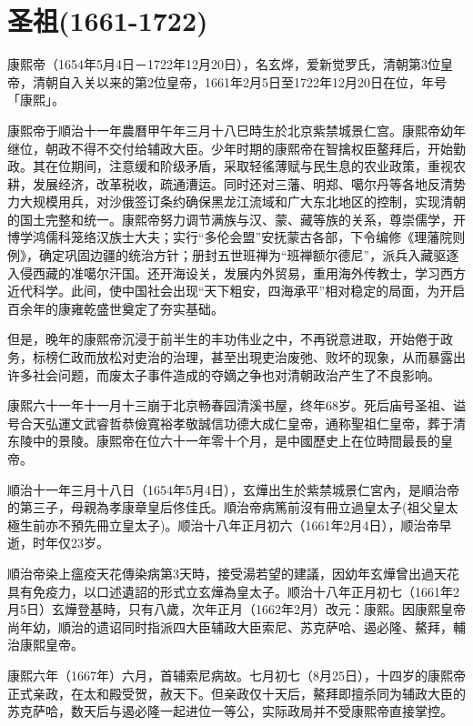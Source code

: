 
\section{圣祖\tiny(1661-1722)}

康熙帝（1654年5月4日－1722年12月20日），名玄烨，爱新觉罗氏，清朝第3位皇帝，清朝自入关以来的第2位皇帝，1661年2月5日至1722年12月20日在位，年号「康熙」。

康熙帝于順治十一年農曆甲午年三月十八巳時生於北京紫禁城景仁宫。康熙帝幼年继位，朝政不得不交付给辅政大臣。少年时期的康熙帝在智擒权臣鳌拜后，开始勤政。其在位期间，注意缓和阶级矛盾，采取轻徭薄赋与民生息的农业政策，重视农耕，发展经济，改革税收，疏通漕运。同时还对三藩、明郑、噶尔丹等各地反清势力大规模用兵，对沙俄签订条约确保黑龙江流域和广大东北地区的控制，实现清朝的国土完整和统一。康熙帝努力调节满族与汉、蒙、藏等族的关系，尊崇儒学，开博学鸿儒科笼络汉族士大夫；实行“多伦会盟”安抚蒙古各部，下令编修《理藩院则例》，确定巩固边疆的统治方针；册封五世班禅为“班禅额尔德尼”，派兵入藏驱逐入侵西藏的准噶尔汗国。还开海设关，发展内外贸易，重用海外传教士，学习西方近代科学。此间，使中国社会出现“天下粗安，四海承平”相对稳定的局面，为开启百余年的康雍乾盛世奠定了夯实基础。

但是，晚年的康熙帝沉浸于前半生的丰功伟业之中，不再锐意进取，开始倦于政务，标榜仁政而放松对吏治的治理，甚至出現吏治废弛、败坏的现象，从而暴露出许多社会问题，而废太子事件造成的夺嫡之争也对清朝政治产生了不良影响。

康熙六十一年十一月十三崩于北京畅春园清溪书屋，终年68岁。死后庙号圣祖、谥号合天弘運文武睿哲恭儉寬裕孝敬誠信功德大成仁皇帝，通称聖祖仁皇帝，葬于清东陵中的景陵。康熙帝在位六十一年零十个月，是中國歷史上在位時間最長的皇帝。

順治十一年三月十八日（1654年5月4日），玄燁出生於紫禁城景仁宮內，是順治帝的第三子，母親為孝康章皇后佟佳氏。順治帝病篤前沒有冊立過皇太子(祖父皇太極生前亦不預先冊立皇太子)。顺治十八年正月初六（1661年2月4日），顺治帝早逝，时年仅23岁。

順治帝染上瘟疫天花傳染病第3天時，接受湯若望的建議，因幼年玄燁曾出過天花具有免疫力，以口述遺詔的形式立玄燁為皇太子。顺治十八年正月初七（1661年2月5日）玄燁登基時，只有八歲，次年正月（1662年2月）改元：康熙。因康熙皇帝尚年幼，順治的遗诏同时指派四大臣辅政大臣索尼、苏克萨哈、遏必隆、鰲拜，輔治康熙皇帝。

康熙六年（1667年）六月，首辅索尼病故。七月初七（8月25日），十四岁的康熙帝正式亲政，在太和殿受贺，赦天下。但亲政仅十天后，鰲拜即擅杀同为辅政大臣的苏克萨哈，数天后与遏必隆一起进位一等公，实际政局并不受康熙帝直接掌控。

